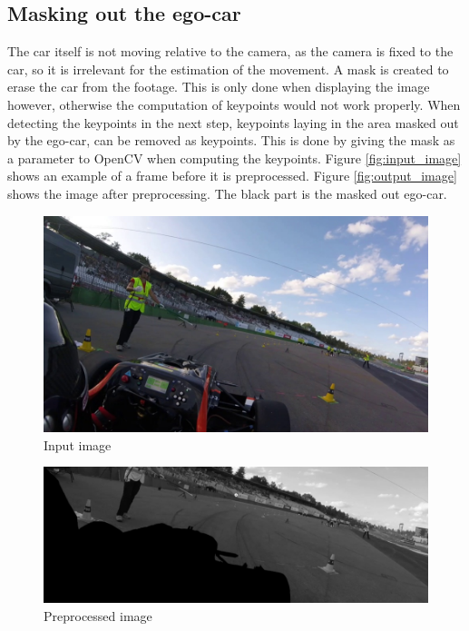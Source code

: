 \subsection{Masking out the ego-car}
\label{ssec:egocar}
The car itself is not moving relative to the camera, as the camera is fixed to the car, so it is irrelevant for the estimation of the movement. A mask is created to erase the car from the footage. This is only done when displaying the image however, otherwise the computation of keypoints would not work properly. When detecting the keypoints in the next step, keypoints laying in the area masked out by the ego-car, can be removed as keypoints. This is done by giving the mask as a parameter to OpenCV when computing the keypoints. Figure \autoref{fig:input_image} shows an example of a frame before it is preprocessed. Figure \autoref{fig:output_image} shows the image after preprocessing. The black part is the masked out ego-car.

\begin{figure}
    \centering
    \includegraphics[width=1\textwidth]{figures/input_image.jpg}
    \caption{Input image}
    \label{fig:input_image}
\end{figure}

\begin{figure}
    \centering
    \includegraphics[width=1\textwidth]{figures/output_image.jpg}
    \caption{Preprocessed image}
    \label{fig:output_image}
\end{figure}

